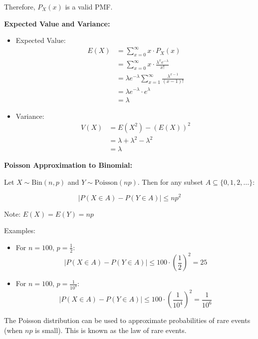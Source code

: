 \documentclass{article}
\begin{document}
    Therefore, $P_X(x)$ is a valid PMF.

    \textbf{Expected Value and Variance:}

    \begin{itemize}
        \item Expected Value:
            \begin{align*}
                E(X) &= \sum_{x=0}^{\infty} x \cdot P_X(x) \\
                &= \sum_{x=0}^{\infty} x \cdot \frac{\lambda^x e^{-\lambda}}{x!} \\
                &= \lambda e^{-\lambda} \sum_{x=1}^{\infty} \frac{\lambda^{x-1}}{(x-1)!} \\
                &= \lambda e^{-\lambda} \cdot e^{\lambda} \\
                &= \lambda
            \end{align*}

        \item Variance:
            \begin{align*}
                V(X) &= E(X^2) - (E(X))^2 \\
                &= \lambda + \lambda^2 - \lambda^2 \\
                &= \lambda
            \end{align*}
    \end{itemize}

    \textbf{Poisson Approximation to Binomial:}

    Let $X \sim \text{Bin}(n, p)$ and $Y \sim \text{Poisson}(np)$. Then for any subset $A \subseteq \{0, 1, 2, \ldots\}$:

    \[|P(X \in A) - P(Y \in A)| \leq np^2\]

    Note: $E(X) = E(Y) = np$

    Examples:
    \begin{itemize}
        \item For $n = 100$, $p = \frac{1}{2}$:
            \[|P(X \in A) - P(Y \in A)| \leq 100 \cdot \left(\frac{1}{2}\right)^2 = 25\]
        
        \item For $n = 100$, $p = \frac{1}{10^4}$:
            \[|P(X \in A) - P(Y \in A)| \leq 100 \cdot \left(\frac{1}{10^4}\right)^2 = \frac{1}{10^6}\]
    \end{itemize}

    The Poisson distribution can be used to approximate probabilities of rare events (when $np$ is small). This is known as the law of rare events.
\end{document}
